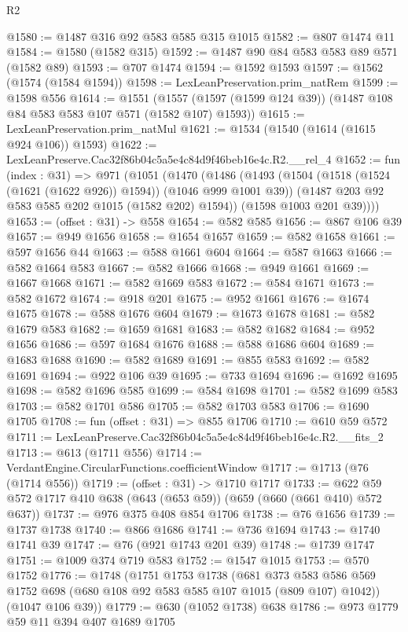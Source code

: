\begin{lexlean}{R2}
\begin{coremodule}
@1580 := @1487 @316 @92 @583 @585 @315 @1015
@1582 := @807 @1474 @11
@1584 := @1580 (@1582 @315)
@1592 := @1487 @90 @84 @583 @583 @89 @571 (@1582 @89)
@1593 := @707 @1474
@1594 := @1592 @1593
@1597 := @1562 (@1574 (@1584 @1594))
@1598 := LexLeanPreservation.prim_natRem
@1599 := @1598 @556
@1614 := @1551
    (@1557 (@1597 (@1599 @124 @39)) (@1487 @108 @84 @583 @583 @107 @571 (@1582 @107) @1593))
@1615 := LexLeanPreservation.prim_natMul
@1621 := @1534 (@1540 (@1614 (@1615 @924 @106)) @1593)
@1622 := LexLeanPreserve.Cac32f86b04c5a5e4c84d9f46beb16e4c.R2.__rel_4
@1652 := fun (index : @31) =>
  @971
    (@1051
      (@1470
        (@1486
          (@1493
            (@1504 (@1518 (@1524 (@1621 (@1622 @926)) @1594)) (@1046 @999 @1001 @39))
            (@1487 @203 @92 @583 @585 @202 @1015 (@1582 @202) @1594))
          (@1598 @1003 @201 @39))))
@1653 := (offset : @31) -> @558
@1654 := @582 @585
@1656 := @867 @106 @39
@1657 := @949 @1656
@1658 := @1654 @1657
@1659 := @582 @1658
@1661 := @597 @1656 @44
@1663 := @588 @1661 @604
@1664 := @587 @1663
@1666 := @582 @1664 @583
@1667 := @582 @1666
@1668 := @949 @1661
@1669 := @1667 @1668
@1671 := @582 @1669 @583
@1672 := @584 @1671
@1673 := @582 @1672
@1674 := @918 @201
@1675 := @952 @1661
@1676 := @1674 @1675
@1678 := @588 @1676 @604
@1679 := @1673 @1678
@1681 := @582 @1679 @583
@1682 := @1659 @1681
@1683 := @582 @1682
@1684 := @952 @1656
@1686 := @597 @1684 @1676
@1688 := @588 @1686 @604
@1689 := @1683 @1688
@1690 := @582 @1689
@1691 := @855 @583
@1692 := @582 @1691
@1694 := @922 @106 @39
@1695 := @733 @1694
@1696 := @1692 @1695
@1698 := @582 @1696 @585
@1699 := @584 @1698
@1701 := @582 @1699 @583
@1703 := @582 @1701 @586
@1705 := @582 @1703 @583
@1706 := @1690 @1705
@1708 := fun (offset : @31) => @855 @1706
@1710 := @610 @59 @572
@1711 := LexLeanPreserve.Cac32f86b04c5a5e4c84d9f46beb16e4c.R2.__fits_2
@1713 := @613 (@1711 @556)
@1714 := VerdantEngine.CircularFunctions.coefficientWindow
@1717 := @1713 (@76 (@1714 @556))
@1719 := (offset : @31) -> @1710 @1717
@1733 := @622 @59 @572 @1717 @410 @638 (@643 (@653 @59)) (@659 (@660 (@661 @410) @572 @637))
@1737 := @976 @375 @408 @854 @1706
@1738 := @76 @1656
@1739 := @1737 @1738
@1740 := @866 @1686
@1741 := @736 @1694
@1743 := @1740 @1741 @39
@1747 := @76 (@921 @1743 @201 @39)
@1748 := @1739 @1747
@1751 := @1009 @374 @719 @583
@1752 := @1547 @1015
@1753 := @570 @1752
@1776 := @1748
    (@1751
      @1753
      @1738
      (@681 @373 @583 @586 @569 @1752 @698 (@680 @108 @92 @583 @585 @107 @1015 (@809 @107) @1042))
      (@1047 @106 @39))
@1779 := @630 (@1052 @1738) @638
@1786 := @973 @1779 @59 @11 @394 @407 @1689 @1705

\end{coremodule}
\end{lexlean}
